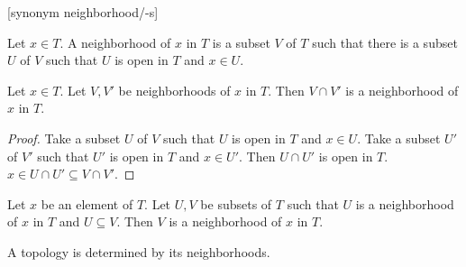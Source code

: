 \documentclass[11pt]{article}
\begin{document}
\begin{forthel}

[synonym neighborhood/-s]

\begin{definition} Let $x \in T$. A neighborhood of $x$ in $T$
is a subset $V$ of $T$ such that there is a subset $U$ of $V$  
such that $U$ is open in $T$ and $x \in U$.
\end{definition}

\begin{lemma} Let $x \in T$. Let $V,V'$ be neighborhoods of $x$ in $T$.
Then $V \cap V'$ is a neighborhood of $x$ in $T$.
\end{lemma}
\begin{proof} Take a subset $U$ of $V$ such that $U$ is open
in $T$ and $x \in U$.
Take a subset $U'$ of $V'$ such that $U'$ is open
in $T$ and $x \in U'$.
Then $U \cap U'$ is open in $T$.
$x \in U \cap U' \subseteq V \cap V'$.
\end{proof}

\begin{lemma}
Let $x$ be an element of $T$. Let $U,V$ be subsets of $T$
such that $U$ is a neighborhood of
$x$ in $T$ and $U \subseteq V$.
Then $V$ is a neighborhood of $x$ in $T$.
\end{lemma}

\end{forthel}
A topology is determined by its neighborhoods.
\end{document}
